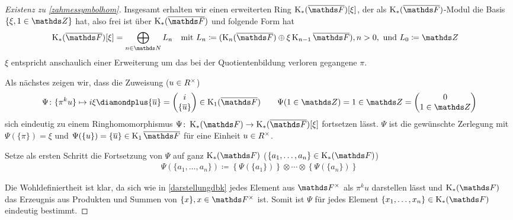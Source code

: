 \documentclass[ngerman,fontsize=11pt, paper=a4, parskip=half, titlepage=true, toc=bib]{scrartcl}
\begin{document}
\begin{proof}[Existenz zu \ref{zahmessymbolhom}]
  Insgesamt erhalten wir einen erweiterten Ring $\KbF[\xi]$, der als
  $\KbF$-Modul die Basis $\{ \xi, 1\in\Z\}$ hat, also frei ist über
  $\KbF$ und folgende Form hat
  \begin{align*}
    \KbF[\xi]&=\bigoplus_{n\in\N}L_n
    &&\text{mit } 
       L_n\coloneqq (\KnbF\oplus\xi\K_{n-1}\bF), n>0,
       \text{ und }L_0\coloneqq\Z
  \end{align*}
  $\xi$ entspricht anschaulich einer Erweiterung um das bei
  der Quotientenbildung verloren gegangene $\pi$.

  Als nächstes zeigen wir, dass die Zuweisung ($u\in R^\times$)
  \begin{gather*}
    \Psi\colon\{\pi^ku\}\mapsto i\xi \p \{\ov u\}
    =\begin{pmatrix} i\\\{\ov u\} \end{pmatrix}\in\K_1(\bF)
    \qquad \Psi(1\in\Z)=1\in\Z=\begin{pmatrix}0\\1\in\Z\end{pmatrix}
  \end{gather*}
  sich eindeutig zu einem Ringhomomorphismus
  $\Psi\colon\KF\to\KbF[\xi]$ fortsetzen lässt.
  $\Psi$ ist die gewünschte Zerlegung mit $\Psi(\{\pi\})=\xi$ 
  und $\Psi(\{u\})=\{\ov u\}\in\K_1\bF$ für
  eine Einheit $u\in R^\times$.

  Setze als ersten Schritt die Fortsetzung von $\Psi$ auf ganz $\KF$
  ($\{a_1,\dotsc,a_n\}\in\KF$)
  \begin{gather*}
    \Psi(\{a_1,\dotsc,a_n\})
    \coloneqq \left\{\Psi(\{a_1\})\right\}\otimes\dotsb
    \otimes \left\{\Psi(\{a_n\})\right\}
  \end{gather*}

  Die Wohldefiniertheit ist klar, da sich wie in \ref{darstellungdbk}
  jedes Element aus $\Fx$ als $\pi^k u$ darstellen lässt und
  $\KF$ das Erzeugnis aus Produkten und Summen von $\{x\}, x\in\Fx$
  ist. Somit ist $\Psi$ für jedes Element $\{x_1,\dotsc,x_n\}\in\KF$ 
  eindeutig bestimmt.


\end{proof}
\end{document}
